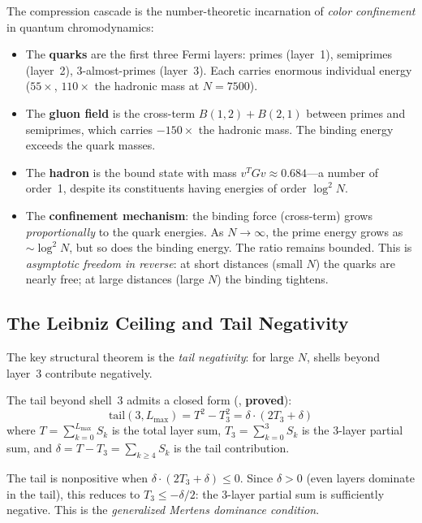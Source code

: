 \begin{correspondence}
\label{corr:confinement}
The compression cascade is the number-theoretic incarnation of
\emph{color confinement} in quantum chromodynamics:

\begin{itemize}
  \item The \textbf{quarks} are the first three Fermi layers:
    primes (layer~1), semiprimes (layer~2), 3-almost-primes (layer~3).
    Each carries enormous individual energy ($55\times$, $110\times$
    the hadronic mass at $N = 7500$).

  \item The \textbf{gluon field} is the cross-term $B(1,2) + B(2,1)$
    between primes and semiprimes, which carries $-150\times$ the
    hadronic mass. The binding energy exceeds the quark masses.

  \item The \textbf{hadron} is the bound state with mass
    $v^T G v \approx 0.684$---a number of order~1, despite its
    constituents having energies of order $\log^2 N$.

  \item The \textbf{confinement mechanism}: the binding force
    (cross-term) grows \emph{proportionally} to the quark energies.
    As $N \to \infty$, the prime energy grows as $\sim \log^2 N$,
    but so does the binding energy. The ratio remains bounded.
    This is \emph{asymptotic freedom in reverse}: at short
    distances (small $N$) the quarks are nearly free; at large
    distances (large $N$) the binding tightens.
\end{itemize}
\end{correspondence}

\subsection{The Leibniz Ceiling and Tail Negativity}

The key structural theorem is the \emph{tail negativity}:
for large $N$, shells beyond layer~3 contribute negatively.

\begin{principle}
The tail beyond shell~3 admits a closed form
(, \textbf{proved}):
\[
  \text{tail}(3, L_{\max}) = T^2 - T_3^2 = \delta \cdot (2T_3 + \delta)
\]
where $T = \sum_{k=0}^{L_{\max}} S_k$ is the total layer sum,
$T_3 = \sum_{k=0}^{3} S_k$ is the 3-layer partial sum, and
$\delta = T - T_3 = \sum_{k \geq 4} S_k$ is the tail contribution.

The tail is nonpositive when $\delta \cdot (2T_3 + \delta) \leq 0$.
Since $\delta > 0$ (even layers dominate in the tail), this reduces
to $T_3 \leq -\delta/2$: the 3-layer partial sum is sufficiently
negative. This is the \emph{generalized Mertens dominance condition}.
\end{principle}

